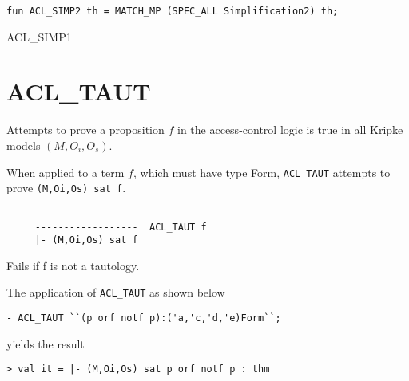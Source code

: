 \IMPLEMENTATION
\begin{holboxed}
\begin{verbatim}
fun ACL_SIMP2 th = MATCH_MP (SPEC_ALL Simplification2) th;
\end{verbatim}
\end{holboxed}

\SEEALSO
ACL\_SIMP1
\ENDDOC

\section{ACL\_TAUT}



\egroup

\SYNOPSIS
Attempts to prove a proposition $f$ in the access-control logic
is true in all Kripke models $(M,O_i,O_s)$.

\DESCRIBE When applied to a term $f$, which must have type Form,
\texttt{ACL\_TAUT} attempts to prove \texttt{(M,Oi,Os) sat f}.
\begin{verbatim}

     ------------------  ACL_TAUT f
     |- (M,Oi,Os) sat f

\end{verbatim}
\FAILURE
Fails if f is not a tautology.

\EXAMPLE
The application of \texttt{ACL\_TAUT} as shown below
\begin{holboxed}
\begin{verbatim}
- ACL_TAUT ``(p orf notf p):('a,'c,'d,'e)Form``;
\end{verbatim}
\end{holboxed}
yields the result
\begin{holboxed}
\begin{verbatim}
> val it = |- (M,Oi,Os) sat p orf notf p : thm
\end{verbatim}
\end{holboxed}

